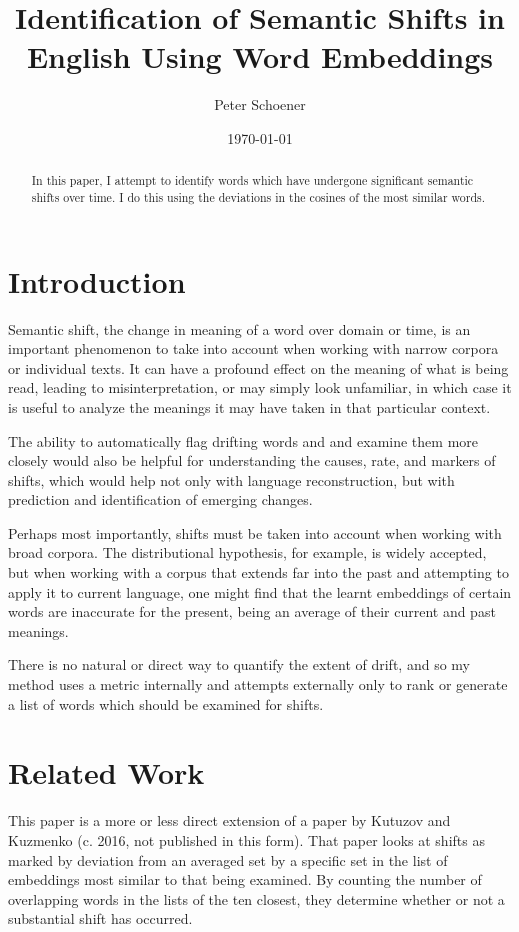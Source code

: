 \documentclass{article}
\title{Identification of Semantic Shifts in English Using Word Embeddings}
\author{Peter Schoener}
\date{\today}
\begin{document}
\maketitle

\begin{abstract}
In this paper, I attempt to identify words which have undergone significant semantic shifts over time. I do this using the deviations in the cosines of the most similar words.
\end{abstract}

\section{Introduction}
Semantic shift, the change in meaning of a word over domain or time, is an important phenomenon to take into account when working with narrow corpora or individual texts. It can have a profound effect on the meaning of what is being read, leading to misinterpretation, or may simply look unfamiliar, in which case it is useful to analyze the meanings it may have taken in that particular context.

The ability to automatically flag drifting words and and examine them more closely would also be helpful for understanding the causes, rate, and markers of shifts, which would help not only with language reconstruction, but with prediction and identification of emerging changes.

Perhaps most importantly, shifts must be taken into account when working with broad corpora. The distributional hypothesis, for example, is widely accepted, but when working with a corpus that extends far into the past and attempting to apply it to current language, one might find that the learnt embeddings of certain words are inaccurate for the present, being an average of their current and past meanings.

There is no natural or direct way to quantify the extent of drift, and so my method uses a metric internally and attempts externally only to rank or generate a list of words which should be examined for shifts.

\section{Related Work}
This paper is a more or less direct extension of a paper by Kutuzov and Kuzmenko (c. 2016, not published in this form). That paper looks at shifts as marked by deviation from an averaged set by a specific set in the list of embeddings most similar to that being examined. By counting the number of overlapping words in the lists of the ten closest, they determine whether or not a substantial shift has occurred.
\end{document}
